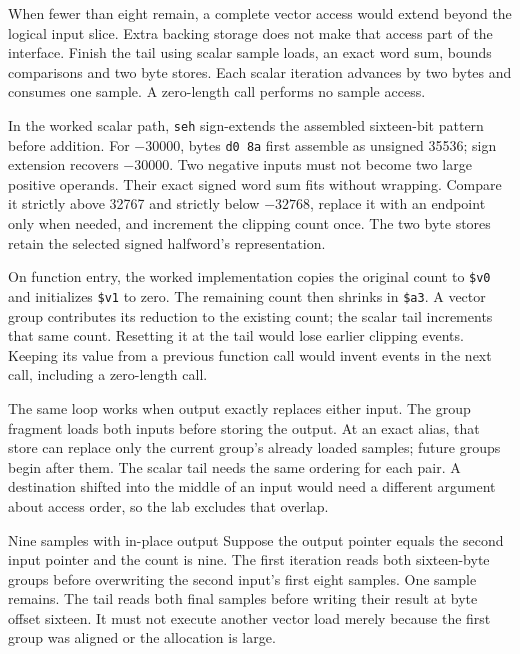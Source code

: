 When fewer than eight remain, a complete vector access would extend beyond the
logical input slice. Extra backing storage does not make that access part of
the interface. Finish the tail using scalar sample loads, an exact word sum,
bounds comparisons and two byte stores. Each scalar iteration advances by two
bytes and consumes one sample. A zero-length call performs no sample access.

In the worked scalar path, \texttt{seh} sign-extends the assembled sixteen-bit
pattern before addition. For $-30000$, bytes \texttt{d0 8a} first assemble as
unsigned 35536; sign extension recovers $-30000$. Two negative inputs must not
become two large positive operands. Their exact signed word sum fits without
wrapping. Compare it strictly above 32767 and strictly below $-32768$, replace
it with an endpoint only when needed, and increment the clipping count once.
The two byte stores retain the selected signed halfword's representation.

On function entry, the worked implementation copies the original count to
\texttt{\$v0} and initializes \texttt{\$v1} to zero. The remaining count then
shrinks in \texttt{\$a3}. A vector group contributes its reduction to the existing
count; the scalar tail increments that same count. Resetting it at the tail would
lose earlier clipping events. Keeping its value from a previous function call
would invent events in the next call, including a zero-length call.

The same loop works when output exactly replaces either input. The group fragment
loads both inputs before storing the output. At an exact alias, that store can
replace only the current group's already loaded samples; future groups begin
after them. The scalar tail needs the same ordering for each pair. A destination
shifted into the middle of an input would need a different argument about access
order, so the lab excludes that overlap.

\begin{MARSWorkedExample}{Nine samples with in-place output}
  Suppose the output pointer equals the second input pointer and the count is nine.
  The first iteration reads both sixteen-byte groups before overwriting the second
  input's first eight samples. One sample remains. The tail reads both final samples
  before writing their result at byte offset sixteen. It must not execute another
  vector load merely because the first group was aligned or the allocation is large.
\end{MARSWorkedExample}

